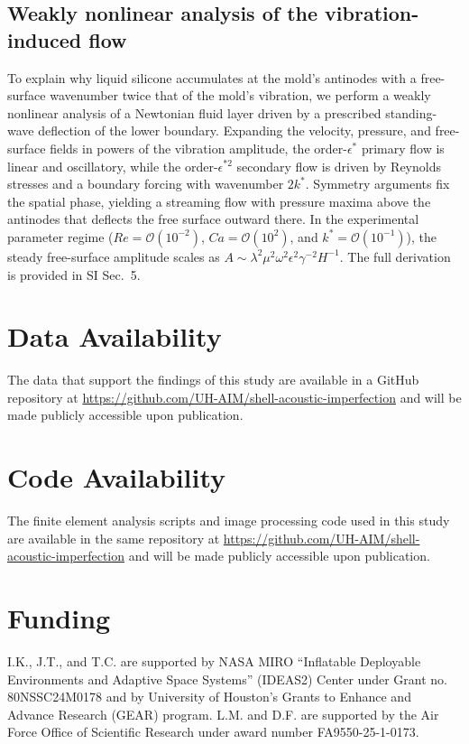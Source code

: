 \documentclass[twocolumn,letter,11pt]{article}
\begin{document}
\subsection*{Weakly nonlinear analysis of the vibration-induced flow}
To explain why liquid silicone accumulates at the mold's antinodes with a free-surface wavenumber twice that of the mold's vibration, we perform a weakly nonlinear analysis of a Newtonian fluid layer driven by a prescribed standing-wave deflection of the lower boundary. Expanding the velocity, pressure, and free-surface fields in powers of the vibration amplitude, the order-$\epsilon^*$ primary flow is linear and oscillatory, while the order-$\epsilon^{*2}$ secondary flow is driven by Reynolds stresses and a boundary forcing with wavenumber $2k^*$. Symmetry arguments fix the spatial phase, yielding a streaming flow with pressure maxima above the antinodes that deflects the free surface outward there. In the experimental parameter regime ($Re = \mathcal{O}(10^{-2})$, $Ca = \mathcal{O}(10^2)$, and $k^* = \mathcal{O}(10^{-1})$), the steady free-surface amplitude scales as $A \sim \lambda^2 \mu^2 \omega^2 \epsilon^2 \gamma^{-2} H^{-1}$. The full derivation is provided in SI Sec.~5.

\section*{Data Availability}
The data that support the findings of this study are available in a GitHub repository at \url{https://github.com/UH-AIM/shell-acoustic-imperfection} and will be made publicly accessible upon publication.

\section*{Code Availability}
The finite element analysis scripts and image processing code used in this study are available in the same repository at \url{https://github.com/UH-AIM/shell-acoustic-imperfection} and will be made publicly accessible upon publication.

  
  

\section*{Funding}
I.K., J.T., and T.C. are supported by NASA MIRO ``Inflatable Deployable Environments and Adaptive Space Systems'' (IDEAS2) Center under Grant no. 80NSSC24M0178 and by University of Houston's Grants to Enhance and Advance Research (GEAR) program. L.M. and D.F. are supported by the Air Force Office of Scientific Research under award number FA9550-25-1-0173. 
\end{document}
